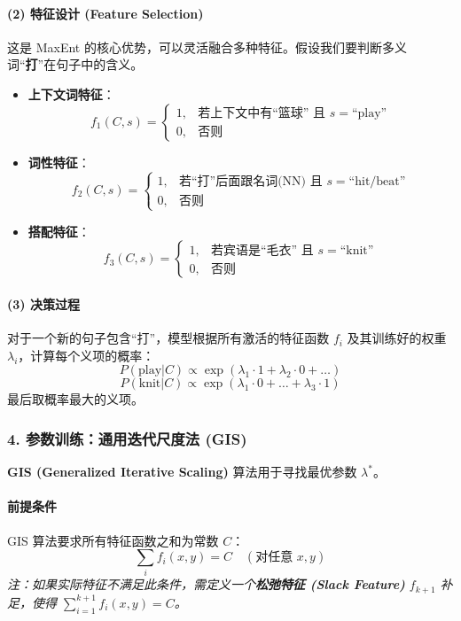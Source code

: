 \documentclass[a4paper, 11pt]{ctexart}
\begin{document}
\paragraph{(2) 特征设计 (Feature Selection)}
这是 MaxEnt 的核心优势，可以灵活融合多种特征。假设我们要判断多义词“\textbf{打}”在句子中的含义。
\begin{itemize}
    \item \textbf{上下文词特征}：
    $$ f_1(C, s) = \begin{cases} 1, & \text{若上下文中有“篮球” 且 } s=\text{“play”} \\ 0, & \text{否则} \end{cases} $$
    \item \textbf{词性特征}：
    $$ f_2(C, s) = \begin{cases} 1, & \text{若“打”后面跟名词(NN) 且 } s=\text{“hit/beat”} \\ 0, & \text{否则} \end{cases} $$
    \item \textbf{搭配特征}：
    $$ f_3(C, s) = \begin{cases} 1, & \text{若宾语是“毛衣” 且 } s=\text{“knit”} \\ 0, & \text{否则} \end{cases} $$
\end{itemize}

\paragraph{(3) 决策过程}
对于一个新的句子包含“打”，模型根据所有激活的特征函数 $f_i$ 及其训练好的权重 $\lambda_i$，计算每个义项的概率：
$$ P(\text{play}|C) \propto \exp(\lambda_1 \cdot 1 + \lambda_2 \cdot 0 + \dots) $$
$$ P(\text{knit}|C) \propto \exp(\lambda_1 \cdot 0 + \dots + \lambda_3 \cdot 1) $$
最后取概率最大的义项。

\subsubsection{4. 参数训练：通用迭代尺度法 (GIS)}
\textbf{GIS (Generalized Iterative Scaling)} 算法用于寻找最优参数 $\lambda^*$。

\paragraph{前提条件}
GIS 算法要求所有特征函数之和为常数 $C$：
$$ \sum_i f_i(x, y) = C \quad (\text{对任意 } x,y) $$
\textit{注：如果实际特征不满足此条件，需定义一个\textbf{松弛特征 (Slack Feature)} $f_{k+1}$ 补足，使得 $\sum_{i=1}^{k+1} f_i(x,y) = C$。}
\end{document}
